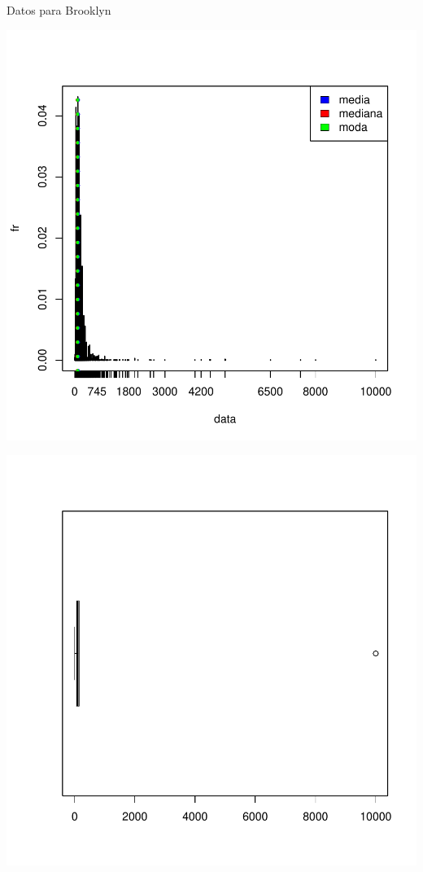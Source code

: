 \documentclass [a4paper] {article}
\begin{document}
Datos para Brooklyn
\begin{center}
\includegraphics{entrega-033}
\end{center}
\begin{center}
\includegraphics{entrega-034}
\end{center}
\end{document}

